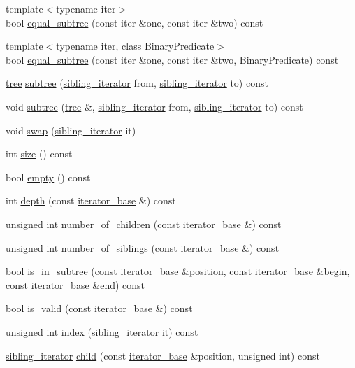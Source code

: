 \begin{CompactItemize}
{\footnotesize template$<$typename iter$>$ }\\bool \hyperlink{classtree_6e2e76dfa6f0f51ca6f573d73b0c1b28}{equal\_\-subtree} (const iter \&one, const iter \&two) const 
\item 
{\footnotesize template$<$typename iter, class BinaryPredicate$>$ }\\bool \hyperlink{classtree_5e8445150c43058416d16b4846ff0f15}{equal\_\-subtree} (const iter \&one, const iter \&two, BinaryPredicate) const 
\item 
\hyperlink{classtree}{tree} \hyperlink{classtree_db61bebed6c56eb5641b0b7fab7fe625}{subtree} (\hyperlink{classtree_1_1sibling__iterator}{sibling\_\-iterator} from, \hyperlink{classtree_1_1sibling__iterator}{sibling\_\-iterator} to) const 
\item 
void \hyperlink{classtree_830cccac50df183c44c6ff83cab5a27f}{subtree} (\hyperlink{classtree}{tree} \&, \hyperlink{classtree_1_1sibling__iterator}{sibling\_\-iterator} from, \hyperlink{classtree_1_1sibling__iterator}{sibling\_\-iterator} to) const 
\item 
void \hyperlink{classtree_e842f9b70235bc2412b3c43bca759448}{swap} (\hyperlink{classtree_1_1sibling__iterator}{sibling\_\-iterator} it)
\item 
int \hyperlink{classtree_219ff1bfc99f78fd9a2db71f41891523}{size} () const 
\item 
bool \hyperlink{classtree_e9f7fd30c51443d46ca8941d5bc06da2}{empty} () const 
\item 
int \hyperlink{classtree_16c66be75ca89c999a9c4a68497b05a1}{depth} (const \hyperlink{classtree_1_1iterator__base}{iterator\_\-base} \&) const 
\item 
unsigned int \hyperlink{classtree_96f82a90a3e21e82f486f325b0cf9faa}{number\_\-of\_\-children} (const \hyperlink{classtree_1_1iterator__base}{iterator\_\-base} \&) const 
\item 
unsigned int \hyperlink{classtree_3cddce970c4d44af57cf9ec0d7c3d009}{number\_\-of\_\-siblings} (const \hyperlink{classtree_1_1iterator__base}{iterator\_\-base} \&) const 
\item 
bool \hyperlink{classtree_825e2106781e846bdd8732c117dc21db}{is\_\-in\_\-subtree} (const \hyperlink{classtree_1_1iterator__base}{iterator\_\-base} \&position, const \hyperlink{classtree_1_1iterator__base}{iterator\_\-base} \&begin, const \hyperlink{classtree_1_1iterator__base}{iterator\_\-base} \&end) const 
\item 
bool \hyperlink{classtree_9605b028195248894dc8cf506cd256e3}{is\_\-valid} (const \hyperlink{classtree_1_1iterator__base}{iterator\_\-base} \&) const 
\item 
unsigned int \hyperlink{classtree_de5ec1ba55f94165062e50d01ec35d86}{index} (\hyperlink{classtree_1_1sibling__iterator}{sibling\_\-iterator} it) const 
\item 
\hyperlink{classtree_1_1sibling__iterator}{sibling\_\-iterator} \hyperlink{classtree_446c722c82607f8b3243a9153b665d19}{child} (const \hyperlink{classtree_1_1iterator__base}{iterator\_\-base} \&position, unsigned int) const 
\end{CompactItemize}
